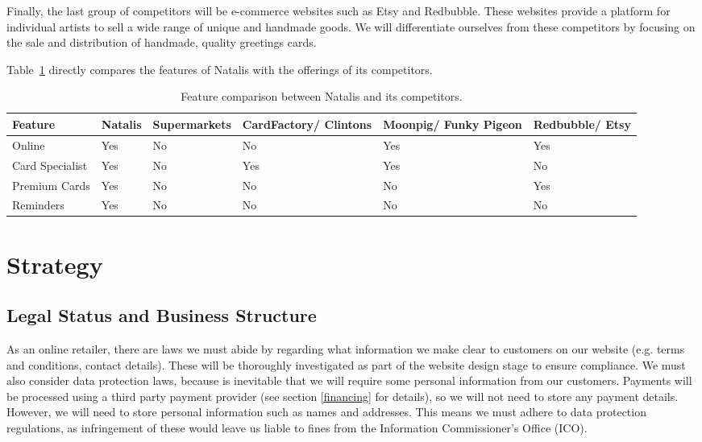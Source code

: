 \documentclass[10pt,a4paper]{article}
\begin{document}
Finally, the last group of competitors will be e-commerce websites such as Etsy and Redbubble. These websites provide a platform for individual artists to sell a wide range of unique and handmade goods. We will differentiate ourselves from these competitors by focusing on the sale and distribution of handmade, quality greetings cards.

Table~\ref{table:competitor_analysis} directly compares the features of Natalis with the offerings of its competitors.

\begin{table}[h]\footnotesize\centering
 \begin{tabular}{ | p{2cm} | p{2cm} | p{2cm} | p{2cm} | p{2cm} | p{2cm} | }
    \hline
    Feature & Natalis & Supermarkets & CardFactory/ Clintons & Moonpig/ Funky Pigeon & Redbubble/ Etsy \\
    \hline
    Online & \cellcolor{tableGreen}Yes & \cellcolor{tableRed}No & \cellcolor{tableRed}No & \cellcolor{tableGreen}Yes & \cellcolor{tableGreen}Yes \\
    Card Specialist & \cellcolor{tableGreen}Yes & \cellcolor{tableRed}No & \cellcolor{tableGreen}Yes & \cellcolor{tableGreen}Yes & \cellcolor{tableRed}No \\
    Premium Cards& \cellcolor{tableGreen}Yes & \cellcolor{tableRed}No & \cellcolor{tableRed}No & \cellcolor{tableRed}No & \cellcolor{tableGreen}Yes \\
    Reminders & \cellcolor{tableGreen}Yes	& \cellcolor{tableRed}No & \cellcolor{tableRed}No & \cellcolor{tableRed}No & \cellcolor{tableRed}No \\
    \hline
  \end{tabular}
  \caption{Feature comparison between Natalis and its competitors.}
	\label{table:competitor_analysis}
\end{table}

\section*{Strategy}
\subsection*{Legal Status and Business Structure}

As an online retailer, there are laws we must abide by regarding what information we make clear to customers on our website (e.g. terms and conditions, contact details). These will be thoroughly investigated as part of the website design stage to ensure compliance. We must also consider data protection laws, because is inevitable that we will require some personal information from our customers. Payments will be processed using a third party payment provider (see section \ref{financing} for details), so we will not need to store any payment details. However, we will need to store personal information such as names and addresses. This means we must adhere to data protection regulations, as infringement of these would leave us liable to fines from the Information Commissioner's Office (ICO).
\end{document}

